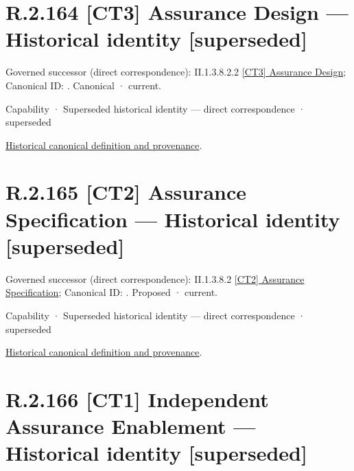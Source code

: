\section*{R.2.164 [CT3] Assurance Design — Historical identity [superseded]}
\label{navigation:R.2.164}

{\small Governed successor (direct correspondence): II.1.3.8.2.2 \hyperref[element:71c8a612b88f4ecba049e94d506bd0c2]{[CT3] Assurance Design}; Canonical ID: \texttt{}. Canonical · current.}\par
\label{element:e1b8db7c95fa4e7ea296351a03532e24}
{\small Capability · Superseded historical identity — direct correspondence · superseded}\par
\href{../../../../../../../continuum/strategy/capability/e1b8db7c95fa4e7ea296351a03532e24.md}{Historical canonical definition and provenance}.\par
\section*{R.2.165 [CT2] Assurance Specification — Historical identity [superseded]}
\label{navigation:R.2.165}

{\small Governed successor (direct correspondence): II.1.3.8.2 \hyperref[element:b81775d89d774cf8ba61731d13c67a54]{[CT2] Assurance Specification}; Canonical ID: \texttt{}. Proposed · current.}\par
\label{element:8006ee0dd95f4d7fb1f408fa09b6ce19}
{\small Capability · Superseded historical identity — direct correspondence · superseded}\par
\href{../../../../../../../continuum/strategy/capability/8006ee0dd95f4d7fb1f408fa09b6ce19.md}{Historical canonical definition and provenance}.\par
\section*{R.2.166 [CT1] Independent Assurance Enablement — Historical identity [superseded]}
\label{navigation:R.2.166}

